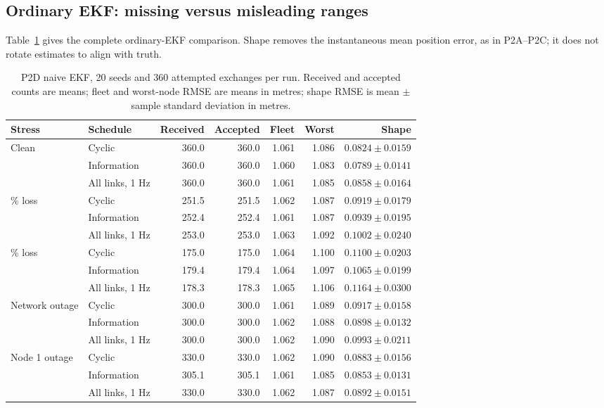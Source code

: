 \subsection{Ordinary EKF: missing versus misleading ranges}
Table~\ref{tab:p2d_naive} gives the complete ordinary-EKF comparison. Shape removes the instantaneous mean position error, as in P2A--P2C; it does not rotate estimates to align with truth.
\begin{table}[htbp]
\centering\small
\caption{P2D naive EKF, 20 seeds and 360 attempted exchanges per run. Received and accepted counts are means; fleet and worst-node RMSE are means in metres; shape RMSE is mean \(\pm\) sample standard deviation in metres.}
\label{tab:p2d_naive}
\begin{tabular}{llrrrrr}
\toprule
Stress & Schedule & Received & Accepted & Fleet & Worst & Shape \\
\midrule
Clean & Cyclic & 360.0 & 360.0 & 1.061 & 1.086 & \(0.0824\pm0.0159\) \\
 & Information & 360.0 & 360.0 & 1.060 & 1.083 & \(0.0789\pm0.0141\) \\
 & All links, 1 Hz & 360.0 & 360.0 & 1.061 & 1.085 & \(0.0858\pm0.0164\) \\
\addlinespace
30\% loss & Cyclic & 251.5 & 251.5 & 1.062 & 1.087 & \(0.0919\pm0.0179\) \\
 & Information & 252.4 & 252.4 & 1.061 & 1.087 & \(0.0939\pm0.0195\) \\
 & All links, 1 Hz & 253.0 & 253.0 & 1.063 & 1.092 & \(0.1002\pm0.0240\) \\
\addlinespace
50\% loss & Cyclic & 175.0 & 175.0 & 1.064 & 1.100 & \(0.1100\pm0.0203\) \\
 & Information & 179.4 & 179.4 & 1.064 & 1.097 & \(0.1065\pm0.0199\) \\
 & All links, 1 Hz & 178.3 & 178.3 & 1.065 & 1.106 & \(0.1164\pm0.0300\) \\
\addlinespace
Network outage & Cyclic & 300.0 & 300.0 & 1.061 & 1.089 & \(0.0917\pm0.0158\) \\
 & Information & 300.0 & 300.0 & 1.062 & 1.088 & \(0.0898\pm0.0132\) \\
 & All links, 1 Hz & 300.0 & 300.0 & 1.062 & 1.090 & \(0.0993\pm0.0211\) \\
\addlinespace
Node 1 outage & Cyclic & 330.0 & 330.0 & 1.062 & 1.090 & \(0.0883\pm0.0156\) \\
 & Information & 305.1 & 305.1 & 1.061 & 1.085 & \(0.0853\pm0.0131\) \\
 & All links, 1 Hz & 330.0 & 330.0 & 1.062 & 1.087 & \(0.0892\pm0.0151\) \\

\end{tabular}
\end{table}
